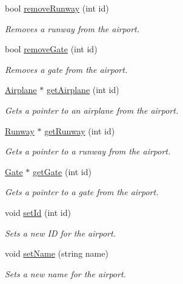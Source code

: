 \begin{DoxyCompactItemize}
bool \mbox{\hyperlink{class_airport_adb2735f0f7402bdf3946b17b10498b67}{remove\+Runway}} (int id)
\begin{DoxyCompactList}\small\item\em Removes a runway from the airport. \end{DoxyCompactList}\item 
bool \mbox{\hyperlink{class_airport_ad0c61d46c5c811fb9a2d45be1826088c}{remove\+Gate}} (int id)
\begin{DoxyCompactList}\small\item\em Removes a gate from the airport. \end{DoxyCompactList}\item 
\mbox{\hyperlink{class_airplane}{Airplane}} $\ast$ \mbox{\hyperlink{class_airport_a29db3fa31b450d90b9a81c9c55d4a320}{get\+Airplane}} (int id)
\begin{DoxyCompactList}\small\item\em Gets a pointer to an airplane from the airport. \end{DoxyCompactList}\item 
\mbox{\hyperlink{class_runway}{Runway}} $\ast$ \mbox{\hyperlink{class_airport_a1d7b9530df732ebee79ce0f1de7616e2}{get\+Runway}} (int id)
\begin{DoxyCompactList}\small\item\em Gets a pointer to a runway from the airport. \end{DoxyCompactList}\item 
\mbox{\hyperlink{class_gate}{Gate}} $\ast$ \mbox{\hyperlink{class_airport_a06570bd57b66959e22ec2fdbf24d3a36}{get\+Gate}} (int id)
\begin{DoxyCompactList}\small\item\em Gets a pointer to a gate from the airport. \end{DoxyCompactList}\item 
void \mbox{\hyperlink{class_airport_a3b8ef3abafb9f29b97acb73eb8014502}{set\+Id}} (int id)
\begin{DoxyCompactList}\small\item\em Sets a new ID for the airport. \end{DoxyCompactList}\item 
void \mbox{\hyperlink{class_airport_a064fd9435cd179b04d94c04a18a96583}{set\+Name}} (string name)
\begin{DoxyCompactList}\small\item\em Sets a new name for the airport. \end{DoxyCompactList}\item 

\end{DoxyCompactItemize}
